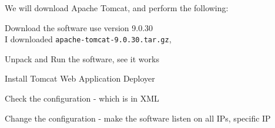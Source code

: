 \documentclass[Screen16to9,17pt]{foils}
\begin{document}

We will download Apache Tomcat, and perform the following:
\begin{list2}
\item Download the software use version 9.0.30\\
I downloaded \verb+apache-tomcat-9.0.30.tar.gz+,
\item Unpack and Run the software, see it works
\item Install Tomcat Web Application Deployer
\item Check the configuration - which is in XML
\item Change the configuration - make the software listen on all IPs, specific IP
\end{list2}


\begin{list2}
\item
\item
\item
\end{list2}



\begin{list2}
\item
\item
\item
\end{list2}




\slidenext
\end{document}
